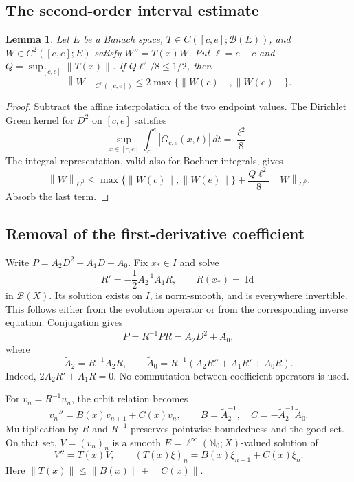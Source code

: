\documentclass[11pt,reqno]{amsart}
\numberwithin{equation}{section}
\newtheorem{lemma}[theorem]{Lemma}
\theoremstyle{definition}
\theoremstyle{remark}
\newcommand{\N}{\mathbb N_0}
\newcommand{\B}{\mathcal B}
\newcommand{\id}{\operatorname{Id}}
\newcommand{\norm}[1]{\left\lVert #1\right\rVert}
\begin{document}
\subsection{The second-order interval estimate}
\begin{lemma}\label{lem:gap}
Let $E$ be a Banach space, $T\in C([c,e];\B(E))$, and $W\in C^2([c,e];E)$ satisfy $W''=T(x)W$. Put $\ell=e-c$ and $Q=\sup_{[c,e]}\norm{T(x)}$. If $Q\ell^2/8\le1/2$, then
\begin{equation}\label{eq:gap}
 \norm{W}_{C^0([c,e])}
 \le2\max\{\norm{W(c)},\norm{W(e)}\}.
\end{equation}
\end{lemma}
\begin{proof}
Subtract the affine interpolation of the two endpoint values. The Dirichlet Green kernel for $D^2$ on $[c,e]$ satisfies
\[
 \sup_{x\in[c,e]}\int_c^e|G_{c,e}(x,t)|\,dt=\frac{\ell^2}{8}.
\]
The integral representation, valid also for Bochner integrals, gives
\[
 \norm{W}_{C^0}
 \le\max\{\norm{W(c)},\norm{W(e)}\}
       +\frac{Q\ell^2}{8}\norm{W}_{C^0}.
\]
Absorb the last term.
\end{proof}

\subsection{Removal of the first-derivative coefficient}
Write $P=A_2D^2+A_1D+A_0$. Fix $x_*\in I$ and solve
\begin{equation}\label{eq:gauge}
 R'=-\frac12A_2^{-1}A_1R,\qquad R(x_*)=\id
\end{equation}
in $\B(X)$. Its solution exists on $I$, is norm-smooth, and is everywhere invertible. This follows either from the evolution operator or from the corresponding inverse equation. Conjugation gives
\[
 \widetilde P=R^{-1}PR=\widetilde A_2D^2+\widetilde A_0,
\]
where
\[
 \widetilde A_2=R^{-1}A_2R,\qquad
 \widetilde A_0=R^{-1}(A_2R''+A_1R'+A_0R).
\]
Indeed, $2A_2R'+A_1R=0$. No commutation between coefficient operators is used.

For $v_n=R^{-1}u_n$, the orbit relation becomes
\begin{equation}\label{eq:reduced}
 v_n''=B(x)v_{n+1}+C(x)v_n,\qquad
 B=\widetilde A_2^{-1},\quad C=-\widetilde A_2^{-1}\widetilde A_0.
\end{equation}
Multiplication by $R$ and $R^{-1}$ preserves pointwise boundedness and the good set. On that set, $V=(v_n)_n$ is a smooth $E=\ell^\infty(\N;X)$-valued solution of
\[
 V''=T(x)V,\qquad (T(x)\xi)_n=B(x)\xi_{n+1}+C(x)\xi_n.
\]
Here $\norm{T(x)}\le\norm{B(x)}+\norm{C(x)}$.
\end{document}
